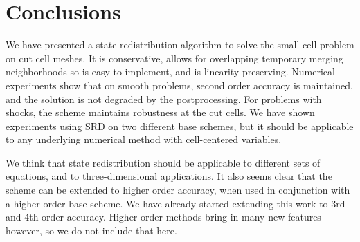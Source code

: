 \section{Conclusions}\label{sec:conc}
We have presented a  state redistribution algorithm to solve the small cell problem on cut cell meshes.  It is conservative, allows for overlapping temporary merging neighborhoods so is easy to implement, and is linearity preserving.   
Numerical experiments show that on smooth problems, second order accuracy is maintained, and the solution is not degraded by the postprocessing. For problems with shocks, the scheme maintains robustness at the cut cells.
We have shown experiments using SRD on two different base schemes, but it should be 
applicable to any underlying numerical method with
cell-centered variables.

We think that state redistribution should be applicable to 
different sets of equations, and to three-dimensional applications.
It also seems clear that the scheme can be extended to higher order accuracy, 
when used in conjunction with a 
higher order base scheme. We have already started extending this work to
3rd and 4th order accuracy. Higher order methods bring 
in many new features however, so we do not include that here.
